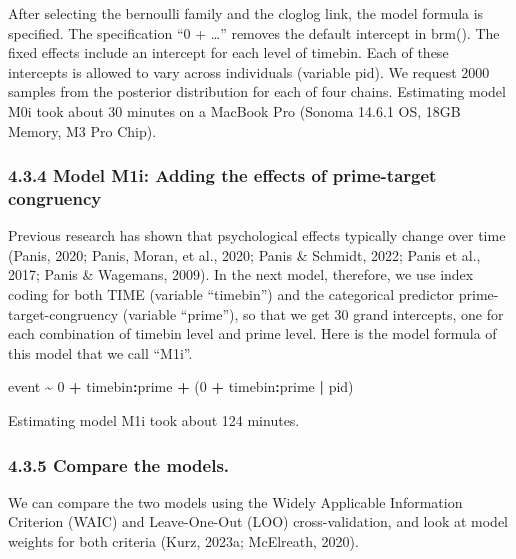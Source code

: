 \documentclass[
  man, donotrepeattitle,floatsintext]{apa6}
\newenvironment{Shaded}{\begin{snugshade}}{\end{snugshade}}
\newcommand{\DecValTok}[1]{\textcolor[rgb]{0.00,0.00,0.81}{#1}}
\newcommand{\NormalTok}[1]{#1}
\newcommand{\SpecialCharTok}[1]{\textcolor[rgb]{0.81,0.36,0.00}{\textbf{#1}}}
\begin{document}
After selecting the bernoulli family and the cloglog link, the model formula is specified. The specification ``0 + \ldots{}'' removes the default intercept in brm(). The fixed effects include an intercept for each level of timebin. Each of these intercepts is allowed to vary across individuals (variable pid). We request 2000 samples from the posterior distribution for each of four chains. Estimating model M0i took about 30 minutes on a MacBook Pro (Sonoma 14.6.1 OS, 18GB Memory, M3 Pro Chip).

\subsubsection{4.3.4 Model M1i: Adding the effects of prime-target congruency}\label{model-m1i-adding-the-effects-of-prime-target-congruency}

Previous research has shown that psychological effects typically change over time (Panis, 2020; Panis, Moran, et al., 2020; Panis \& Schmidt, 2022; Panis et al., 2017; Panis \& Wagemans, 2009). In the next model, therefore, we use index coding for both TIME (variable ``timebin'') and the categorical predictor prime-target-congruency (variable ``prime''), so that we get 30 grand intercepts, one for each combination of timebin level and prime level. Here is the model formula of this model that we call ``M1i''.

\begin{Shaded}
\begin{Highlighting}[]
\NormalTok{event }\SpecialCharTok{\textasciitilde{}} \DecValTok{0} \SpecialCharTok{+}\NormalTok{ timebin}\SpecialCharTok{:}\NormalTok{prime }\SpecialCharTok{+}\NormalTok{ (}\DecValTok{0} \SpecialCharTok{+}\NormalTok{ timebin}\SpecialCharTok{:}\NormalTok{prime }\SpecialCharTok{|}\NormalTok{ pid)}
\end{Highlighting}
\end{Shaded}

Estimating model M1i took about 124 minutes.

\subsubsection{4.3.5 Compare the models.}\label{compare-the-models.}

We can compare the two models using the Widely Applicable Information Criterion (WAIC) and Leave-One-Out (LOO) cross-validation, and look at model weights for both criteria (Kurz, 2023a; McElreath, 2020).
\end{document}
